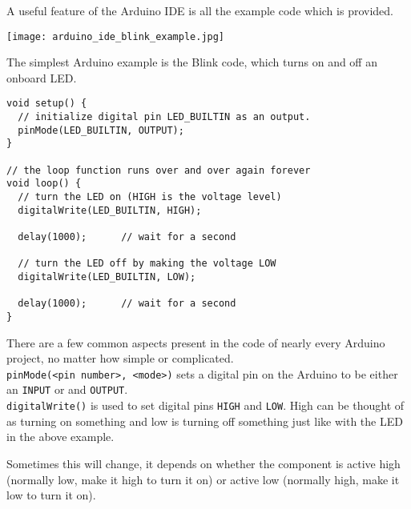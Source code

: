 \documentclass[../TinyBot.tex]{subfiles}
\begin{document}
A useful feature of the Arduino IDE is all the example code which is provided.
\begin{center}
    \texttt{[image: arduino\_ide\_blink\_example.jpg]}
    \label{fig:ide-blink}
\end{center}

The simplest Arduino example is the Blink code, which turns on and off an onboard LED.

\begin{lstlisting}
void setup() {
  // initialize digital pin LED_BUILTIN as an output.
  pinMode(LED_BUILTIN, OUTPUT);
}

// the loop function runs over and over again forever
void loop() {
  // turn the LED on (HIGH is the voltage level)
  digitalWrite(LED_BUILTIN, HIGH); 

  delay(1000);      // wait for a second

  // turn the LED off by making the voltage LOW
  digitalWrite(LED_BUILTIN, LOW);  
  
  delay(1000);      // wait for a second
}
\end{lstlisting}


There are a few common aspects present in the code of nearly every Arduino project, no matter how simple or complicated. \\


\lstinline[]!pinMode(<pin number>, <mode>)! sets a digital pin on the Arduino to be either an \lstinline[]!INPUT! or and \lstinline[]!OUTPUT!. \\


\lstinline[]!digitalWrite()! is used to set digital pins \lstinline[]!HIGH! and \lstinline[]!LOW!. High can be thought of as turning on something and low is turning off something just like with the LED in the above example. 

Sometimes this will change, it depends on whether the component is active high (normally low, make it high to turn it on) or active low (normally high, make it low to turn it on).
\end{document}
